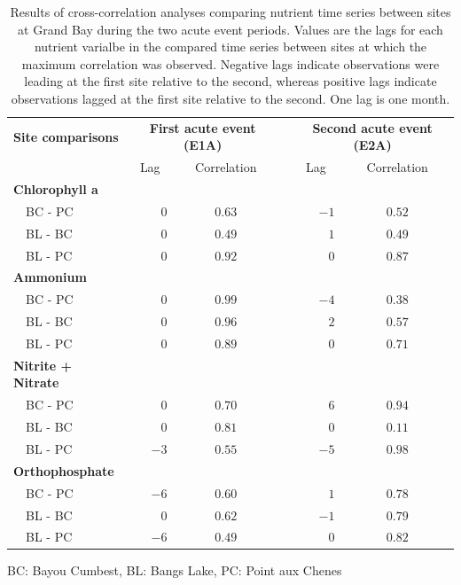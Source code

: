 \documentclass[letterpaper,12pt]{article}\usepackage[]{graphicx}\usepackage[]{color}
\begin{document}
\begin{table}[!tbp]
\caption{Results of cross-correlation analyses comparing nutrient time series between sites at Grand Bay during the two acute event periods.  Values are the lags for each nutrient varialbe in the compared time series between sites at which the maximum correlation was observed.  Negative lags indicate observations were leading at the first site relative to the second, whereas positive lags indicate observations lagged at the first site relative to the second.  One lag is one month.\label{tab:ccfnut}} 
\begin{center}
\begin{tabular}{lrccrc}
\hline\hline
\multicolumn{1}{l}{\bfseries Site comparisons}&\multicolumn{2}{c}{\bfseries First acute event (E1A)}&\multicolumn{1}{c}{\bfseries }&\multicolumn{2}{c}{\bfseries Second acute event (E2A)}\tabularnewline
\cline{2-3} \cline{5-6}
\multicolumn{1}{l}{}&\multicolumn{1}{c}{Lag}&\multicolumn{1}{c}{Correlation}&\multicolumn{1}{c}{}&\multicolumn{1}{c}{Lag}&\multicolumn{1}{c}{Correlation}\tabularnewline
\hline
{\bfseries Chlorophyll a}&&&&&\tabularnewline
~~BC - PC&$ 0$&$0.63$&&$-1$&$0.52$\tabularnewline
~~BL - BC&$ 0$&$0.49$&&$ 1$&$0.49$\tabularnewline
~~BL - PC&$ 0$&$0.92$&&$ 0$&$0.87$\tabularnewline
\hline
{\bfseries Ammonium}&&&&&\tabularnewline
~~BC - PC&$ 0$&$0.99$&&$-4$&$0.38$\tabularnewline
~~BL - BC&$ 0$&$0.96$&&$ 2$&$0.57$\tabularnewline
~~BL - PC&$ 0$&$0.89$&&$ 0$&$0.71$\tabularnewline
\hline
{\bfseries Nitrite + Nitrate}&&&&&\tabularnewline
~~BC - PC&$ 0$&$0.70$&&$ 6$&$0.94$\tabularnewline
~~BL - BC&$ 0$&$0.81$&&$ 0$&$0.11$\tabularnewline
~~BL - PC&$-3$&$0.55$&&$-5$&$0.98$\tabularnewline
\hline
{\bfseries Orthophosphate}&&&&&\tabularnewline
~~BC - PC&$-6$&$0.60$&&$ 1$&$0.78$\tabularnewline
~~BL - BC&$ 0$&$0.62$&&$-1$&$0.79$\tabularnewline
~~BL - PC&$-6$&$0.49$&&$ 0$&$0.82$\tabularnewline
\hline
\end{tabular}\end{center}

\footnotesize BC: Bayou Cumbest, BL: Bangs Lake, PC: Point aux Chenes\end{table}
\end{document}
